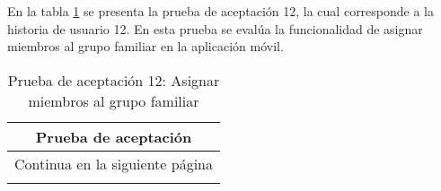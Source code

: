En la tabla \ref{tab:prueba-12} se presenta la prueba de aceptación 12, la cual corresponde a la historia de usuario 12.
En esta prueba se evalúa la funcionalidad de asignar miembros al grupo familiar en la aplicación móvil.

\begin{longtable}{|p{6.7cm}|p{6.7cm}|}
    \caption{Prueba de aceptación 12: Asignar miembros al grupo familiar} \label{tab:prueba-12}
    \\
    \hline
    \multicolumn{2}{|c|}{\textbf{Prueba de aceptación}}                                                                                                                                                                                                                                                           \\
    \hline

    \endfirsthead

    \hline
    \endhead

    \hline
    \multicolumn{2}{|c|}{{Continua en la siguiente página}}                                                                                                                                                                                                                                                       \\
    \hline
    \endfoot


\end{longtable}
